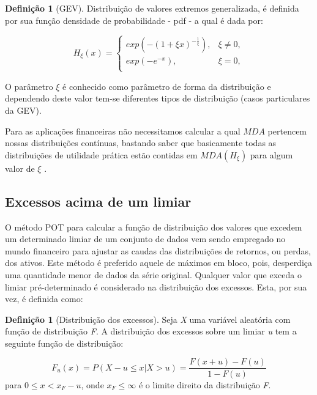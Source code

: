 \documentclass[1p]{elsarticle}
\theoremstyle{definition}
\newtheorem{defi}[teor]{Definição}
\begin{document}
\begin{defi}[GEV] \label{defi:GEV}
	Distribuição de valores extremos generalizada, é definida por sua função densidade de probabilidade - pdf - a qual é dada por:
	
	\begin{equation}
	\label{eq:GEV}
	H_\xi(x) = 
	\begin{cases}
	exp(-(1+\xi x)^{-\frac{1}{\xi}}), & \xi \neq 0,\\
	exp(-e^{-x}), & \xi = 0,\\
	\end{cases}
	\end{equation}
\end{defi}

O parâmetro $\xi$ é conhecido como parâmetro de forma da distribuição e dependendo deste valor tem-se diferentes tipos de distribuição (casos particulares da GEV). %

Para as aplicações financeiras não necessitamos calcular a qual $MDA$ pertencem nossas distribuições contínuas, bastando saber que basicamente todas as distribuições de utilidade prática estão contidas em $MDA(H_\xi)$ para algum valor de $\xi$ \cite[p. ~139]{McNeil2015}.

\subsection{Excessos acima de um limiar}
\label{sec:excess}

O método POT para calcular a função de distribuição dos valores que excedem um determinado limiar de um conjunto de dados vem sendo empregado no mundo financeiro para ajustar as caudas das distribuições de retornos, ou perdas, dos ativos. Este método é preferido aquele de máximos em bloco, pois, desperdiça uma quantidade menor de dados da série original. Qualquer valor que exceda o limiar pré-determinado é considerado na distribuição dos excessos. Esta, por sua vez, é definida como:

\begin{defi}[Distribuição dos excessos] \label{defi:excess}
	Seja \emph{X} uma variável aleatória com função de distribuição \emph{F}. A distribuição dos excessos sobre um limiar \emph{u} tem a seguinte função de distribuição:
	
	\begin{equation}
	\label{eq:excessdist}
	F_u(x)=P(X-u \leq x | X > u)=\frac{F(x+u)-F(u)}{1-F(u)}
	\end{equation}
	para $0 \leq x < x_F-u$, onde $x_F \leq \infty$ é o limite direito da distribuição \emph{F}.
\end{defi}
\end{document}
